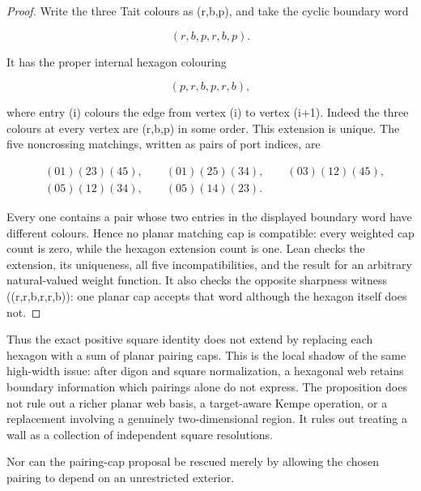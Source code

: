 \begin{proof}
Write the three Tait colours as (r,b,p), and take the cyclic boundary word

\[
                         (r,b,p,r,b,p).
\]

It has the proper internal hexagon colouring

\[
                         (p,r,b,p,r,b),
\]

where entry (i) colours the edge from vertex (i) to vertex (i+1).
Indeed the three colours at every vertex are (r,b,p) in some order.  This
extension is unique.  The five noncrossing matchings, written as pairs of
port indices, are

\[
\begin{split}
 &(01)(23)(45),\qquad (01)(25)(34),\qquad (03)(12)(45),\\
 &(05)(12)(34),\qquad (05)(14)(23).
\end{split}
\]

Every one contains a pair whose two entries in the displayed boundary word
have different colours.  Hence no planar matching cap is compatible: every
weighted cap count is zero, while the hexagon extension count is one.  Lean
checks the extension, its uniqueness, all five incompatibilities, and the
result for an arbitrary natural-valued weight function.  It also checks the
opposite sharpness witness ((r,r,b,r,r,b)): one planar cap accepts that word
although the hexagon itself does not.
\end{proof}

Thus the exact positive square identity does not extend by replacing each
hexagon with a sum of planar pairing caps.  This is the local shadow of the
same high-width issue: after digon and square normalization, a hexagonal web
retains boundary information which pairings alone do not express.  The
proposition does not rule out a richer planar web basis, a target-aware
Kempe operation, or a replacement involving a genuinely two-dimensional
region.  It rules out treating a wall as a collection of independent square
resolutions.

Nor can the pairing-cap proposal be rescued merely by allowing the chosen
pairing to depend on an unrestricted exterior.

